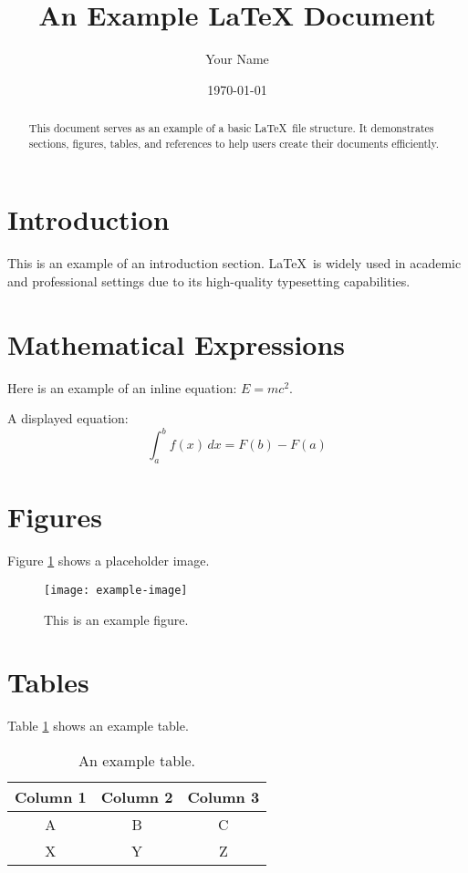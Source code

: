 \documentclass[a4paper, 12pt]{article}
\title{An Example LaTeX Document}
\author{Your Name}
\date{\today}
\begin{document}
\maketitle

\begin{abstract}
This document serves as an example of a basic \LaTeX\ file structure. It demonstrates sections, figures, tables, and references to help users create their documents efficiently.
\end{abstract}

\section{Introduction}
This is an example of an introduction section. \LaTeX\ is widely used in academic and professional settings due to its high-quality typesetting capabilities.

\section{Mathematical Expressions}
Here is an example of an inline equation: \( E = mc^2 \).

A displayed equation:
\[
\int_a^b f(x)\,dx = F(b) - F(a)
\]

\section{Figures}
Figure \ref{fig:example} shows a placeholder image.

\begin{figure}[h]
    \centering
    \texttt{[image: example-image]} %
    \caption{This is an example figure.}
    \label{fig:example}
\end{figure}

\section{Tables}
Table \ref{tab:example} shows an example table.

\begin{table}[h]
    \centering
    \begin{tabular}{|c|c|c|}
    \hline
    Column 1 & Column 2 & Column 3 \\
    \hline
    A & B & C \\
    X & Y & Z \\
    \hline
    \end{tabular}
    \caption{An example table.}
    \label{tab:example}
\end{table}
\end{document}
